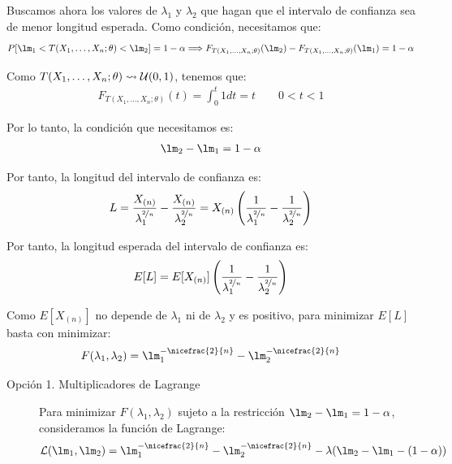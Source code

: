 \begin{ejercicio}[de Examen]
\begin{enumerate}
        Buscamos ahora los valores de $\lambda_1$ y $\lambda_2$ que hagan que el intervalo de confianza sea de menor longitud esperada. Como condición, necesitamos que:
        \begin{align*}
            P[\lm_1 < T(X_1, \ldots, X_n; \theta) < \lm_2] = 1 - \alpha\Longrightarrow F_{T(X_1, \ldots, X_n; \theta)}(\lm_2) - F_{T(X_1, \ldots, X_n; \theta)}(\lm_1) = 1 - \alpha
        \end{align*}

        Como $T(X_1, \ldots, X_n; \theta) \rightsquigarrow \mathcal{U}(0, 1)$, tenemos que:
        \begin{align*}
            F_{T(X_1, \ldots, X_n; \theta)}(t) = \int_{0}^{t} 1 dt = t\qquad 0 < t < 1
        \end{align*}

        Por lo tanto, la condición que necesitamos es:
        \begin{align*}
            \lm_2 - \lm_1 = 1 - \alpha
        \end{align*}

        Por tanto, la longitud del intervalo de confianza es:
        \begin{align*}
            L = \dfrac{X_{(n)}}{\lambda_1^{\nicefrac{2}{n}}} - \dfrac{X_{(n)}}{\lambda_2^{\nicefrac{2}{n}}} = X_{(n)}\left(\dfrac{1}{\lambda_1^{\nicefrac{2}{n}}} - \dfrac{1}{\lambda_2^{\nicefrac{2}{n}}}\right)
        \end{align*}

        Por tanto, la longitud esperada del intervalo de confianza es:
        \begin{align*}
            E[L] = E[X_{(n)}]\left(\dfrac{1}{\lambda_1^{\nicefrac{2}{n}}} - \dfrac{1}{\lambda_2^{\nicefrac{2}{n}}}\right)
        \end{align*}

        Como $E[X_{(n)}]$ no depende de $\lambda_1$ ni de $\lambda_2$ y es positivo, para minimizar $E[L]$ basta con minimizar:
        \begin{equation*}
            F(\lambda_1, \lambda_2) = \lm_1^{-\nicefrac{2}{n}} - \lm_2^{-\nicefrac{2}{n}}
        \end{equation*}

        \begin{description}
            \item[Opción 1. Multiplicadores de Lagrange]
            
            Para minimizar $F(\lambda_1, \lambda_2)$ sujeto a la restricción $\lm_2 - \lm_1 = 1 - \alpha$, consideramos la función de Lagrange:
            \begin{align*}
                \cc{L}(\lm_1, \lm_2) = \lm_1^{-\nicefrac{2}{n}} - \lm_2^{-\nicefrac{2}{n}} - \lambda(\lm_2 - \lm_1 - (1 - \alpha))
            \end{align*}


\end{description}
\end{enumerate}
\end{ejercicio}

